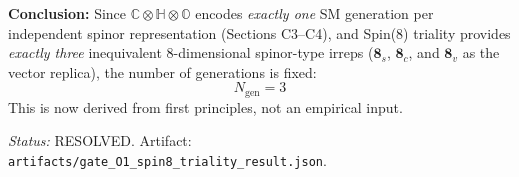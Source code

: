 \begin{tcolorbox}[colback=green!6!white, colframe=green!60!black, title={Proof O1 — $N_\mathrm{gen}=3$ from D$_4$ Triality (RESOLVED)}]
\textbf{Conclusion:} Since $\mathbb{C}\otimes\mathbb{H}\otimes\mathbb{O}$ encodes \emph{exactly one} SM generation per independent spinor representation (Sections C3--C4), and Spin(8) triality provides \emph{exactly three} inequivalent 8-dimensional spinor-type irreps ($\mathbf{8}_s$, $\mathbf{8}_c$, and $\mathbf{8}_v$ as the vector replica), the number of generations is fixed:
\begin{equation}
    \boxed{N_\mathrm{gen} = 3}
\end{equation}
This is now derived from first principles, not an empirical input.

\textit{Status:} RESOLVED. Artifact: \texttt{artifacts/\allowbreak gate\_\allowbreak O1\_\allowbreak spin8\_\allowbreak triality\_\allowbreak result.json}.
\end{tcolorbox}


